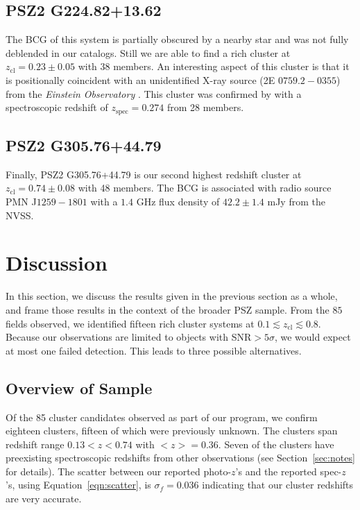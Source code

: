 \documentclass[apj, revtex4-1]{emulateapj}
\begin{document}
\subsection{PSZ2 G224.82+13.62} %
The BCG of this system is partially obscured by a nearby star and was not fully deblended in our catalogs. Still we are able to find a rich cluster at $z_\mathrm{cl} = 0.23 \pm 0.05$ with 38 members. An interesting aspect of this cluster is that it is positionally coincident with an unidentified X-ray source (2E $0759.2-0355$) from the \textit{Einstein Observatory} \citep{Harris1990}. This cluster was confirmed by \cite{Barrena2018} with a spectroscopic redshift of $z_\mathrm{spec} = 0.274$ from 28 members.

\subsection{PSZ2 G305.76+44.79} %
Finally, PSZ2 G305.76+44.79 is our second highest redshift cluster at $z_\mathrm{cl} = 0.74 \pm 0.08$ with 48 members. The BCG is associated with radio source PMN J$1259-1801$ with a $1.4$ GHz flux density of $42.2\pm 1.4$ mJy from the NVSS.


\section{Discussion}\label{sec:discussion}
In this section, we discuss the results given in the previous section as a whole, and frame those results in the context of the broader PSZ sample. From the $85$ fields observed, we identified fifteen rich cluster systems at $0.1\lesssim z_\mathrm{cl} \lesssim 0.8$. Because our observations are limited to objects with SNR$>5\sigma$, we would expect at most one failed detection. This leads to three possible alternatives.

\subsection{Overview of Sample}
Of the 85 cluster candidates observed as part of our program, we confirm eighteen clusters, fifteen of which were previously unknown. The clusters span redshift range $ 0.13 < z < 0.74$ with $<z> = 0.36$. Seven of the clusters have preexisting spectroscopic redshifts from other observations (see Section~\ref{sec:notes} for details). The scatter between our reported photo-$z$'s and the reported spec-$z$'s, using Equation~\ref{eqn:scatter}, is $\sigma_f = 0.036$ indicating that our cluster redshifts are very accurate.
\end{document}
